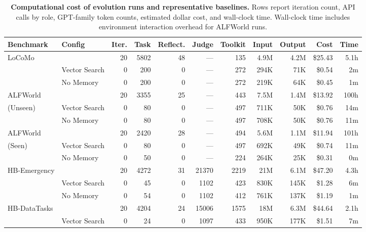 \begin{table}[!htbp]
\centering
\caption{\textbf{Computational cost of evolution runs and representative baselines.}
Rows report iteration count, API calls by role, GPT-family token counts, estimated dollar cost, and wall-clock time.
Wall-clock time includes environment interaction overhead for ALFWorld runs.}
\label{tab:cost}
\small
\setlength{\tabcolsep}{4pt}
\begin{tabular}{@{}ll r rrrr rr r r@{}}
\toprule
\textbf{Benchmark} & \textbf{Config} & \textbf{Iter.} & \textbf{Task} & \textbf{Reflect.} & \textbf{Judge} & \textbf{Toolkit} & \textbf{Input} & \textbf{Output} & \textbf{Cost} & \textbf{Time} \\
\midrule
LoCoMo        & \sysname{} & 20 & 5802 & 48 & --- & 135 & 4.9M & 4.2M & \$25.43 & 5.1h \\
              & Vector Search     &  0 &  200 &  0 & --- & 272 & 294K &  71K &  \$0.54 &  2m \\
              & No Memory       &  0 &  200 &  0 & --- & 272 & 219K &  64K &  \$0.45 &  1m \\
\midrule
ALFWorld      & \sysname{} & 20 & 3355 & 25 & --- & 443 & 7.5M & 1.4M & \$13.92 & 100h \\
(Unseen)      & Vector Search     &  0 &   80 &  0 & --- & 497 & 711K &  50K &  \$0.76 & 14m \\
              & No Memory       &  0 &   80 &  0 & --- & 497 & 708K &  50K &  \$0.76 & 11m \\
\midrule
ALFWorld      & \sysname{} & 20 & 2420 & 28 & --- & 494 & 5.6M & 1.1M & \$11.94 & 101h \\
(Seen)        & Vector Search     &  0 &   80 &  0 & --- & 497 & 692K &  49K &  \$0.74 & 11m \\
              & No Memory       &  0 &   50 &  0 & --- & 224 & 264K &  25K &  \$0.31 &  0m \\
\midrule
HB-Emergency  & \sysname{} & 20 & 4272 & 31 & 21370 & 2219 & 21M & 6.1M & \$47.20 & 4.3h \\
              & Vector Search     &  0 &   45 &  0 &  1102 &  423 & 830K & 145K &  \$1.28 &  6m \\
              & No Memory       &  0 &   54 &  0 &  1102 &  412 & 761K & 137K &  \$1.19 &  1m \\
\midrule
HB-DataTasks  & \sysname{} & 20 & 4204 & 24 & 15006 & 1575 & 18M & 6.3M & \$44.64 & 2.1h \\
              & Vector Search     &  0 &   24 &  0 &  1097 &  433 & 950K & 177K &  \$1.51 &  7m \\

\end{tabular}
\end{table}
